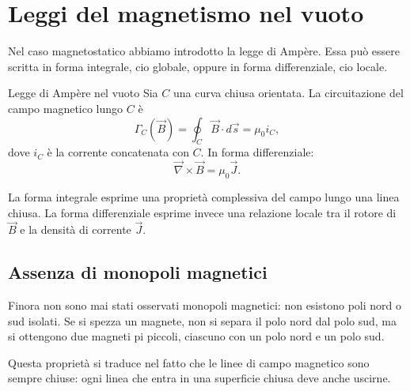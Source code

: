 \documentclass[a4paper]{article}
\begin{document}
\section{Leggi del magnetismo nel vuoto}

Nel caso magnetostatico abbiamo introdotto la legge di Ampère. Essa può essere scritta in forma integrale, cio globale, oppure in forma differenziale, cio locale.

\begin{snippettheorem}{Legge di Ampère nel vuoto}
Sia \(C\) una curva chiusa orientata. La circuitazione del campo magnetico lungo \(C\) è
\[
    \Gamma_C(\vec{B})=\oint_C \vec{B}\cdot d\vec{s}=\mu_0 i_C,
\]
dove \(i_C\) è la corrente concatenata con \(C\). In forma differenziale:
\[
    \vec{\nabla}\times\vec{B}=\mu_0\vec{J}.
\]
\end{snippettheorem}

La forma integrale esprime una proprietà complessiva del campo lungo una linea chiusa. La forma differenziale esprime invece una relazione locale tra il rotore di \(\vec{B}\) e la densità di corrente \(\vec{J}\).

\subsection{Assenza di monopoli magnetici}

Finora non sono mai stati osservati monopoli magnetici: non esistono poli nord o sud isolati. Se si spezza un magnete, non si separa il polo nord dal polo sud, ma si ottengono due magneti pi piccoli, ciascuno con un polo nord e un polo sud.

\begin{center}
\end{center}

Questa proprietà si traduce nel fatto che le linee di campo magnetico sono sempre chiuse: ogni linea che entra in una superficie chiusa deve anche uscirne.
\end{document}
